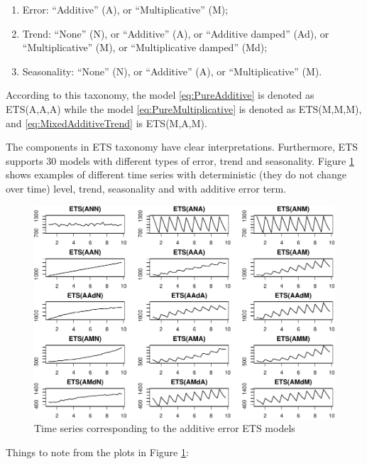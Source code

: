 \documentclass[
]{book}
\providecommand{\tightlist}{%
  \setlength{\itemsep}{0pt}\setlength{\parskip}{0pt}}
\theoremstyle{definition}
\theoremstyle{definition}
\theoremstyle{definition}
\theoremstyle{definition}
\theoremstyle{remark}
\begin{document}
\begin{enumerate}
\def\labelenumi{\arabic{enumi}.}
\tightlist
\item
  Error: ``Additive'' (A), or ``Multiplicative'' (M);
\item
  Trend: ``None'' (N), or ``Additive'' (A), or ``Additive damped'' (Ad), or ``Multiplicative'' (M), or ``Multiplicative damped'' (Md);
\item
  Seasonality: ``None'' (N), or ``Additive'' (A), or ``Multiplicative'' (M).
\end{enumerate}

According to this taxonomy, the model \eqref{eq:PureAdditive} is denoted as ETS(A,A,A) while the model \eqref{eq:PureMultiplicative} is denoted as ETS(M,M,M), and \eqref{eq:MixedAdditiveTrend} is ETS(M,A,M).

The components in ETS taxonomy have clear interpretations. Furthermore, ETS supports 30 models with different types of error, trend and seasonality. Figure \ref{fig:ETSTaxonomyAdditive} shows examples of different time series with deterministic (they do not change over time) level, trend, seasonality and with additive error term.

\begin{figure}
\centering
\includegraphics{adam_files/figure-latex/ETSTaxonomyAdditive-1.pdf}
\caption{\label{fig:ETSTaxonomyAdditive}Time series corresponding to the additive error ETS models}
\end{figure}

Things to note from the plots in Figure \ref{fig:ETSTaxonomyAdditive}:
\end{document}
